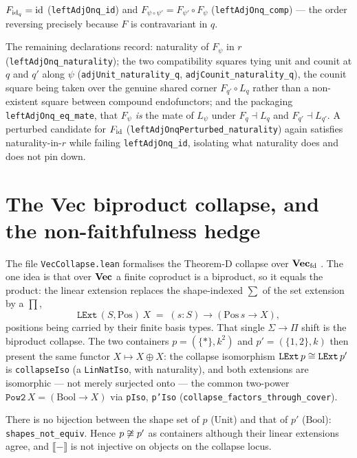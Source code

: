 \begin{proposition}
$F_{\mathrm{id}_q}=\mathrm{id}$ (\texttt{leftAdjOnq\_id}) and $F_{\psi\circ\psi'}=F_{\psi'}\circ F_\psi$ (\texttt{leftAdjOnq\_comp}) --- the order reversing precisely because $F$ is contravariant in $q$.
\end{proposition}

The remaining declarations record: naturality of $F_\psi$ in $r$ (\texttt{leftAdjOnq\_naturality}); the two compatibility squares tying unit and counit at $q$ and $q'$ along $\psi$ (\texttt{adjUnit\_naturality\_q}, \texttt{adjCounit\_naturality\_q}), the counit square being taken over the genuine shared corner $F_{q'}\circ L_q$ rather than a non-existent square between compound endofunctors; and the packaging \texttt{leftAdjOnq\_eq\_mate}, that $F_\psi$ \emph{is} the mate of $L_\psi$ under $F_q\dashv L_q$ and $F_{q'}\dashv L_{q'}$. A perturbed candidate for $F_{\mathrm{id}}$ (\texttt{leftAdjOnqPerturbed\_naturality}) again satisfies naturality-in-$r$ while failing \texttt{leftAdjOnq\_id}, isolating what naturality does and does not pin down.

\section{The Vec biproduct collapse, and the non-faithfulness hedge}
\label{sec:leancob-vec}

The file \texttt{VecCollapse.lean} formalises the Theorem-D collapse over $\mathbf{Vec}_{\mathrm{fd}}$ \cite{macbeth-reduction}. The one idea is that over $\mathbf{Vec}$ a finite coproduct is a biproduct, so it equals the product: the linear extension replaces the shape-indexed $\sum$ of the set extension by a $\prod$,
\[
  \texttt{LExt}\,(S,\mathrm{Pos})\,X \;=\; (s:S)\to(\mathrm{Pos}\,s \to X),
\]
positions being carried by their finite basis types. That single $\Sigma\!\to\!\Pi$ shift is the biproduct collapse. The two containers $p=(\{\ast\},k^2)$ and $p'=(\{1,2\},k)$ then present the same functor $X\mapsto X\oplus X$: the collapse isomorphism $\texttt{LExt}\,p\cong\texttt{LExt}\,p'$ is \texttt{collapseIso} (a \texttt{LinNatIso}, with naturality), and both extensions are isomorphic --- not merely surjected onto --- the common two-power $\texttt{Pow2}\,X=(\mathrm{Bool}\to X)$ via \texttt{pIso}, \texttt{p'Iso} (\texttt{collapse\_factors\_through\_cover}).

\begin{proposition}
There is no bijection between the shape set of $p$ ($\mathrm{Unit}$) and that of $p'$ ($\mathrm{Bool}$): \texttt{shapes\_not\_equiv}. Hence $p\not\cong p'$ as containers although their linear extensions agree, and $\llbracket-\rrbracket$ is not injective on objects on the collapse locus.
\end{proposition}

